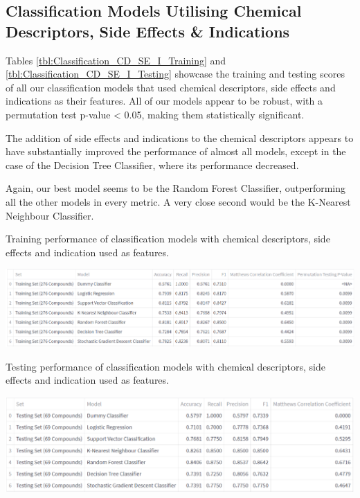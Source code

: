 \subsection{Classification Models Utilising Chemical Descriptors, Side Effects \& Indications}

Tables \ref{tbl:Classification_CD_SE_I_Training} and \ref{tbl:Classification_CD_SE_I_Testing} showcase the training and testing scores of all our classification models that used chemical descriptors, side effects and indications as their features. All of our models appear to be robust, with a permutation test p-value < 0.05, making them statistically significant. 

The addition of side effects and indications to the chemical descriptors appears to have substantially improved the performance of almost all models, except in the case of the Decision Tree Classifier, where its performance decreased.

Again, our best model seems to be the Random Forest Classifier, outperforming all the other models in every metric. A very close second would be the K-Nearest Neighbour Classifier.

\begin{table}[!ht]
  \caption{Training performance of classification models with chemical descriptors, side effects and indication used as features.}
  \label{tbl:Classification_CD_SE_I_Training}
  \includegraphics[width=1.0\linewidth]{images/Classification CD SE I Training.pdf}
\end{table}

\newpage

\begin{table}[!ht]
  \caption{Testing performance of classification models with chemical descriptors, side effects and indication used as features.}
  \label{tbl:Classification_CD_SE_I_Testing}
  \includegraphics[width=1.0\linewidth]{images/Classification CD SE I Testing.pdf}
\end{table}


